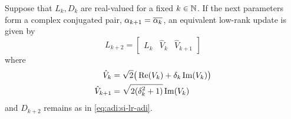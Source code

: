 \begin{corollary}
  Suppose that $L_k, D_k$ are real-valued for a fixed $k\in\N$.
  If the next parameters form a complex conjugated pair,
  $\alpha_{k+1} = \conj{\alpha_k}$,
  an equivalent low-rank update is given by
  \begin{equation*}
    L_{k+2} = \begin{bmatrix}
      L_k &
      \hat V_k &
      \hat V_{k+1}
    \end{bmatrix}
  \end{equation*}
  where
  \begin{align*}
    \hat V_k &= \sqrt{2} \big( \Re(V_k) + \delta_k \Im(V_k) \big) \\
    \hat V_{k+1} &= \sqrt{\smash[b]{2(\delta_k^2 + 1)}} \Im(V_k)
  \end{align*}
  and $D_{k+2}$ remains as in \eqref{eq:adi:si-lr-adi}.
\end{corollary}
